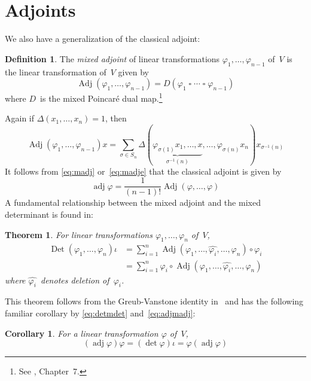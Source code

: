 \documentclass[letterpaper]{article}
\newcommand{\after}{\circ}
\newcommand{\bprod}{\mathbin{\square}}
\DeclareMathOperator{\Det}{Det}
\DeclareMathOperator{\adj}{adj}
\DeclareMathOperator{\Adj}{Adj}
\newcommand{\delete}{\widehat}
\newcommand{\multi}[4]{#2_{#3}#1\cdots#1#2_{#4}}
\newcommand{\bprods}[3]{\multi{\bprod}{#1}{#2}{#3}}
\theoremstyle{definition}
\newtheorem{defn}{Definition}
\theoremstyle{plain}
\newtheorem{thm}{Theorem}
\newtheorem{cor}{Corollary}
\begin{document}
\section*{Adjoints}
We also have a generalization of the classical adjoint:
\begin{defn}
The \emph{mixed adjoint} of linear transformations \(\varphi_1,\ldots,\varphi_{n-1}\) of~\(V\) is the linear transformation of~\(V\) given by
\begin{equation}
\Adj(\varphi_1,\ldots,\varphi_{n-1})=D(\bprods{\varphi}{1}{n-1})\label{eq:madj}
\end{equation}
where \(D\)~is the mixed Poincar\'e dual map.\footnote{See \cite{greub}, Chapter~7.}
\end{defn}
\noindent Again if \(\Delta(x_1,\ldots,x_n)=1\), then
\begin{equation}
\Adj(\varphi_1,\ldots,\varphi_{n-1})x=\sum_{\sigma\in S_n}\Delta(\underbrace{\varphi_{\sigma(1)}x_1,\ldots,x}_{\sigma^{-1}(n)},\ldots,\varphi_{\sigma(n)}x_n)x_{\sigma^{-1}(n)}\label{eq:madje}
\end{equation}
\noindent It follows from \eqref{eq:madj} or~\eqref{eq:madje} that the classical adjoint is given by
\begin{equation}
\adj\varphi=\frac{1}{(n-1)!}\Adj(\varphi,\ldots,\varphi)\label{eq:adjmadj}
\end{equation}
A fundamental relationship between the mixed adjoint and the mixed determinant is found in:
\begin{thm}
For linear transformations \(\varphi_1,\ldots,\varphi_n\) of~\(V\),
\begin{align}
\Det(\varphi_1,\ldots,\varphi_n)\iota&=\sum_{i=1}^n\Adj(\varphi_1,\ldots,\delete{\varphi_i},\ldots,\varphi_n)\after\varphi_i\label{eq:mdetmadjr}\\
	&=\sum_{i=1}^n\varphi_i\after\Adj(\varphi_1,\ldots,\delete{\varphi_i},\ldots,\varphi_n)\label{eq:mdetmadjl}
\end{align}
where \(\delete{\varphi_i}\)~denotes deletion of~\(\varphi_i\).
\end{thm}
\noindent This theorem follows from the Greub-Vanstone identity in~\cite{greubvanstone} and has the following familiar corollary by \eqref{eq:detmdet} and~\eqref{eq:adjmadj}:
\begin{cor}
For a linear transformation \(\varphi\) of~\(V\),
\begin{equation}
(\adj\varphi)\varphi=(\det\varphi)\iota=\varphi(\adj\varphi)\label{eq:detadj}
\end{equation}
\end{cor}
\end{document}
